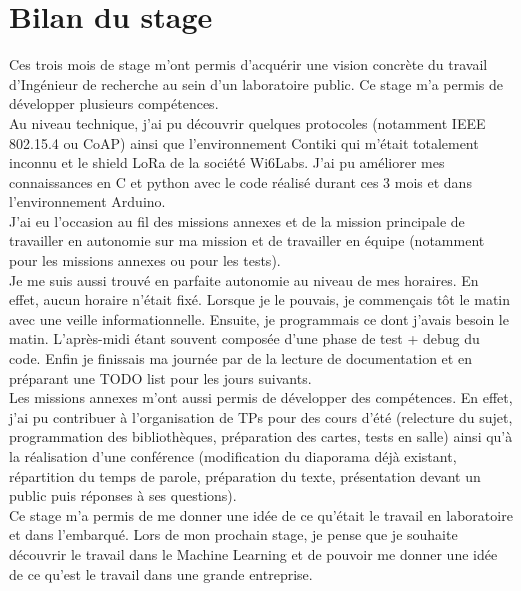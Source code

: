 \documentclass{article}
\begin{document}
\section{Bilan du stage}
Ces trois mois de stage m'ont permis d'acquérir une vision concrète du travail d'Ingénieur de recherche au sein d'un laboratoire public.
Ce stage m'a permis de développer plusieurs compétences.\\
Au niveau technique, j'ai pu découvrir quelques protocoles (notamment IEEE 802.15.4 ou CoAP) ainsi que l'environnement Contiki qui m'était totalement inconnu et le shield LoRa de la société Wi6Labs. J'ai pu améliorer mes connaissances en C et python avec le code réalisé durant ces 3 mois et dans l'environnement Arduino.\\
J'ai eu l'occasion au fil des missions annexes et de la mission principale de travailler en autonomie sur ma mission et de travailler en équipe (notamment pour les missions annexes ou pour les tests).\\
Je me suis aussi trouvé en parfaite autonomie au niveau de mes horaires. En effet, aucun horaire n'était fixé. Lorsque je le pouvais, je commençais tôt le matin avec une veille informationnelle. Ensuite, je programmais ce dont j'avais besoin le matin. L'après-midi étant souvent composée d'une phase de test + debug du code. Enfin je finissais ma journée par de la lecture de documentation et en préparant une TODO list pour les jours suivants.\\
Les missions annexes m'ont aussi permis de développer des compétences. En effet, j'ai pu contribuer à l'organisation de TPs pour des cours d'été (relecture du sujet, programmation des bibliothèques, préparation des cartes, tests en salle) ainsi qu'à la réalisation d'une conférence (modification du diaporama déjà existant, répartition du temps de parole, préparation du texte, présentation devant un public puis réponses à ses questions).\\
Ce stage m'a permis de me donner une idée de ce qu'était le travail en laboratoire et dans l'embarqué. Lors de mon prochain stage, je pense que je souhaite découvrir le travail dans le Machine Learning et de pouvoir me donner une idée de ce qu'est le travail dans une grande entreprise.
\newpage
\appendix
\end{document}
